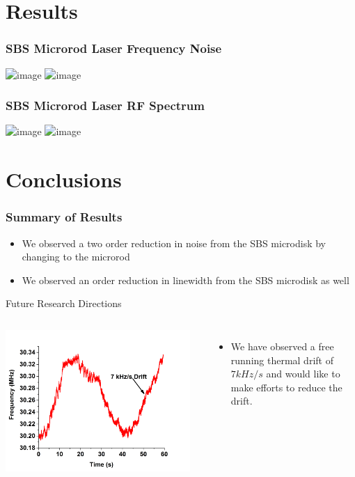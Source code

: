 \documentclass{beamer}
\begin{document}
\section{Results}
\begin{frame}\frametitle{SBS Microrod Laser Frequency Noise}
\includegraphics<1>[width=1.0\textwidth]{Images/Freq_Noise_Comparison_Plot1.png}
\includegraphics<2>[width=1.0\textwidth]{Images/Freq_Noise_Comparison_Plot2.png}
\end{frame}

\begin{frame}\frametitle{SBS Microrod Laser RF Spectrum}
\includegraphics<1>[width=1.0\textwidth]{Images/RF_Spectrum_Plot1.png}
\includegraphics<2>[width=1.0\textwidth]{Images/RF_Spectrum_Plot2.png}
\end{frame}

\section{Conclusions}
\begin{frame}\frametitle{Summary of Results}
\begin{itemize}
\item We observed a two order reduction in noise from the SBS microdisk by changing to the microrod
\item We observed an order reduction in linewidth from the SBS microdisk as well
\end{itemize}

\begin{block}{Future Research Directions}
\begin{columns}
\includegraphics[width=0.95\textwidth]{Images/Thermal_Drift.png}
\begin{itemize}
\item We have observed a free running thermal drift of $7kHz/s$ and would like to make efforts to reduce the drift.
\end{itemize}
\end{columns}

\end{block}
\end{frame}
\end{document}
